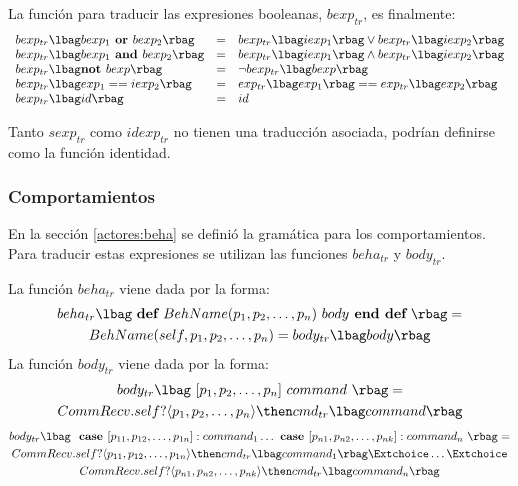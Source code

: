 La función para traducir las expresiones booleanas, $bexp_{tr}$, es finalmente:
\begin{equation*}
\begin{array}{l c l}
bexp_{tr}\func{bexp_1 \textbf{ or } bexp_2}    &=& bexp_{tr}\func{iexp_1} \vee bexp_{tr}\func{iexp_2} \\
bexp_{tr}\func{bexp_1 \textbf{ and } bexp_2}   &=& bexp_{tr}\func{iexp_1} \wedge bexp_{tr}\func{iexp_2} \\
bexp_{tr}\func{\textbf{not } bexp }            &=& \neg bexp_{tr}\func{bexp} \\ 
bexp_{tr}\func{ exp_1 == iexp_2}               &=& exp_{tr}\func{exp_1} == exp_{tr}\func{exp_2} \\
bexp_{tr}\func{id} 							   &=& id
\end{array}
\end{equation*}

Tanto $sexp_{tr}$ como $idexp_{tr}$ no tienen una traducción asociada, podrían definirse como la función identidad.

\subsubsection*{Comportamientos}
En la sección \ref{actores:beha} se definió la gramática para los comportamientos. Para traducir estas expresiones se utilizan las funciones $beha_{tr}$ y $body_{tr}$.

La función $beha_{tr}$ viene dada por la forma:
\begin{multline*}
beha_{tr}\func{\ \textbf{def } BehName(p_1, p_2,\ldots, p_n)\ body \textbf{ end def}\ } = \\
BehName(self, p_1, p_2,\ldots, p_n) = body_{tr}\func{body} 
\end{multline*}
La función $body_{tr}$ viene dada por la forma:
\begin{multline*}
body_{tr}\func{\ [ p_1, p_2,\ldots, p_n]\ command\ } = \\
 CommRecv.self?\langle p_1, p_2,\ldots, p_n \rangle \then cmd_{tr}\func{command}
\end{multline*}
\begin{multline*}
body_{tr}\func{\ \textbf{ case } [p_{11}, p_{12},\ldots, p_{1n}]: command_1 \ldots \textbf{ case } [p_{n1}, p_{n2},\ldots, p_{nk}]: command_n\ } = \\
CommRecv.self?\langle p_{11}, p_{12},\ldots, p_{1n} \rangle \then cmd_{tr}\func{command_1} \Extchoice \ldots \Extchoice \\
CommRecv.self?\langle p_{n1}, p_{n2},\ldots, p_{nk} \rangle \then cmd_{tr}\func{command_n} 
\end{multline*}

